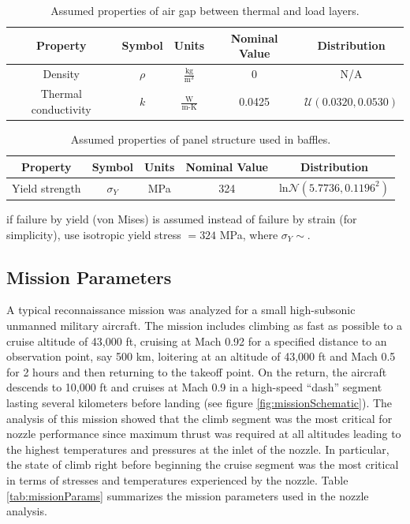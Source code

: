 \documentclass{article}
\begin{document}
\begin{table}
\caption[Air gap material properties]{Assumed properties of air gap between thermal and load layers.}
\label{tab:matPropAirGap}
\begin{center}
\begin{tabular}[]{ c | c | c | c | c }
\textbf{Property} & \textbf{Symbol} & \textbf{Units} & \textbf{Nominal Value} & \textbf{Distribution} \\ \hline
Density & $\rho$ & $\frac{\textrm{kg}}{\textrm{m}^3}$ & 0 & N/A \\ \hline
Thermal conductivity & $k$ & $\frac{\textrm{W}}{\textrm{m-K}}$ & 0.0425 &  $\mathcal{U}(0.0320,0.0530)$ \\ \hline
\end{tabular}
\end{center}
\end{table}

\begin{table}
\caption[Panel structure material properties]{Assumed properties of panel structure used in baffles.}
\label{tab:matPropPanel}
\begin{center}
\begin{tabular}[]{ c | c | c | c | c }
\textbf{Property} & \textbf{Symbol} & \textbf{Units} & \textbf{Nominal Value} & \textbf{Distribution} \\ \hline
Yield strength & $\sigma_Y$ & MPa & 324 & $\textrm{ln}\mathcal{N}(5.7736,0.1196^2)$ \\ \hline
\end{tabular}
\end{center}
\end{table}

if failure by yield (von Mises) is assumed instead of failure by strain (for simplicity), use isotropic yield stress $ = 324$ MPa, where $\sigma_Y \sim$.

\subsection{Mission Parameters}

A typical reconnaissance mission was analyzed for a small high-subsonic unmanned military aircraft. The mission includes climbing as fast as possible to a cruise altitude of 43,000 ft, cruising at Mach 0.92 for a specified distance to an observation point, say 500 km, loitering at an altitude of 43,000 ft and Mach 0.5 for 2 hours and then returning to the takeoff point. On the return, the aircraft descends to 10,000 ft and cruises at Mach 0.9 in a high-speed ``dash'' segment lasting several kilometers before landing (see figure \ref{fig:missionSchematic}). The analysis of this mission showed that the climb segment was the most critical for nozzle performance since maximum thrust was required at all altitudes leading to the highest temperatures and pressures at the inlet of the nozzle. In particular, the state of climb right before beginning the cruise segment was the most critical in terms of stresses and temperatures experienced by the nozzle. Table \ref{tab:missionParams} summarizes the mission parameters used in the nozzle analysis.
\end{document}
